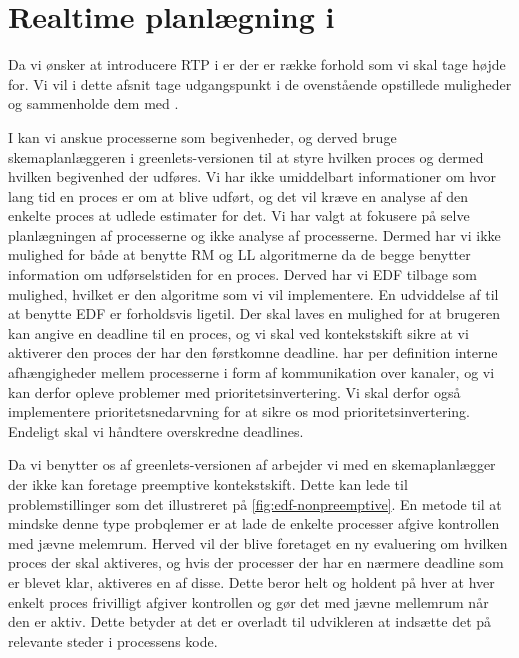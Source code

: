 \section{Realtime planlægning i \pycsp}
\label{sec:rtp-pycsp}

Da vi ønsker at introducere RTP i \pycsp er der er række forhold som vi skal tage højde for. Vi vil i dette afsnit tage udgangspunkt i de ovenstående opstillede muligheder og sammenholde dem med \pycsp. 

I \pycsp kan vi anskue processerne som begivenheder, og derved bruge skemaplanlæggeren i greenlets-versionen til at styre hvilken proces og dermed hvilken begivenhed der udføres. Vi har ikke umiddelbart informationer om hvor lang tid en proces er om at blive udført, og det vil kræve en analyse af den enkelte proces at udlede estimater for det. Vi har valgt at fokusere på selve planlægningen af processerne og ikke analyse af processerne. Dermed har vi ikke mulighed for både at benytte RM og LL algoritmerne da de begge benytter information om udførselstiden for en proces. Derved har vi EDF tilbage som mulighed, hvilket er den algoritme som vi vil implementere. En udviddelse af \pycsp til at benytte EDF er forholdsvis ligetil. Der skal laves en mulighed for at brugeren kan angive en deadline til en proces, og vi skal ved kontekstskift sikre at vi aktiverer den proces der har den førstkomne deadline. \pycsp har per definition interne afhængigheder mellem processerne i form af kommunikation over kanaler, og vi kan derfor opleve problemer med prioritetsinvertering. Vi skal derfor også implementere prioritetsnedarvning for at sikre os mod prioritetsinvertering. Endeligt skal vi håndtere overskredne deadlines.

Da vi benytter os af greenlets-versionen af \pycsp arbejder vi med en skemaplanlægger der ikke kan foretage preemptive kontekstskift. Dette kan lede til problemstillinger som det illustreret på \cref{fig:edf-nonpreemptive}. En metode til at mindske denne type probqlemer er at lade de enkelte processer afgive kontrollen med jævne melemrum. Herved vil der blive foretaget en ny evaluering om hvilken proces der skal aktiveres, og hvis der processer der har en nærmere deadline som er blevet klar, aktiveres en af disse. Dette beror helt og holdent på hver at hver enkelt proces frivilligt afgiver kontrollen og gør det med jævne mellemrum når den er aktiv. Dette betyder at det er overladt til udvikleren at indsætte det på relevante steder i processens kode. 

